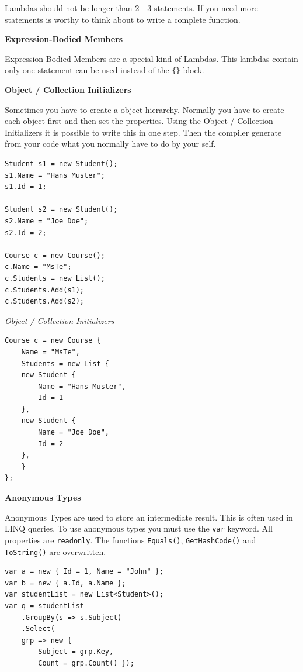 \documentclass[11pt,twoside,landscape]{article}
\begin{document}
\begin{multicols}{3}
Lambdas should not be longer than 2 - 3 statements.
If you need more statements is worthy to think about to write a complete function.

\textbf{Expression-Bodied Members}

Expression-Bodied Members are a special kind of Lambdas.
This lambdas contain only one statement can be used instead of the \texttt{\{\}} block.

\textbf{Object / Collection Initializers}

Sometimes you have to create a object hierarchy.
Normally you have to create each object first and then set the properties.
Using the Object / Collection Initializers it is possible to write this in one step.
Then the compiler generate from your code what you normally have to do by your self.

\lstset{language=csharp,label= ,caption= ,captionpos=b,numbers=none}
\begin{lstlisting}
Student s1 = new Student();
s1.Name = "Hans Muster";
s1.Id = 1;

Student s2 = new Student();
s2.Name = "Joe Doe";
s2.Id = 2;

Course c = new Course();
c.Name = "MsTe";
c.Students = new List();
c.Students.Add(s1);
c.Students.Add(s2);
\end{lstlisting}

\emph{Object / Collection Initializers}
\lstset{language=csharp,label= ,caption= ,captionpos=b,numbers=none}
\begin{lstlisting}
Course c = new Course {
    Name = "MsTe",
    Students = new List {
	new Student {
	    Name = "Hans Muster",
	    Id = 1
	},
	new Student {
	    Name = "Joe Doe",
	    Id = 2
	},
    }
};
\end{lstlisting}

\textbf{Anonymous Types}

Anonymous Types are used to store an intermediate result.
This is often used in LINQ queries.
To use anonymous types you must use the \texttt{var} keyword.
All properties are \texttt{readonly}.
The functions \texttt{Equals()}, \texttt{GetHashCode()} and \texttt{ToString()} are overwritten.

\lstset{language=csharp,label= ,caption= ,captionpos=b,numbers=none}
\begin{lstlisting}
var a = new { Id = 1, Name = "John" };
var b = new { a.Id, a.Name };
var studentList = new List<Student>();
var q = studentList
    .GroupBy(s => s.Subject)
    .Select(
	grp => new {
	    Subject = grp.Key,
	    Count = grp.Count() });
\end{lstlisting}


\end{multicols}
\end{document}
